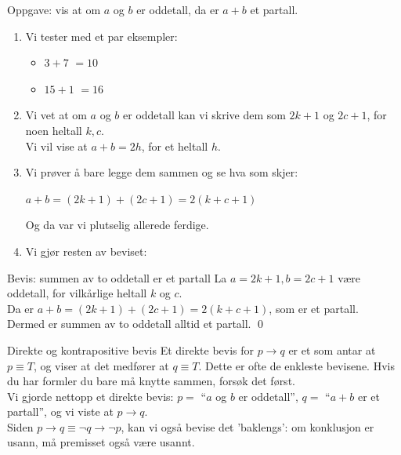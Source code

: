 \begin{frame}{Oppgave: vis at om $a$ og $b$ er oddetall, da er $a + b$ et partall.}
    \pause
    \begin{enumerate}
        \item Vi tester med et par eksempler: 
        \begin{itemize}
            \item $3+7$ \pause $= 10$ \checkmark
            \pause
            \item $15+1$ \pause $ = 16$ \checkmark
        \end{itemize}
        \pause
        \item Vi vet at om $a$ og $b$ er oddetall kan vi skrive dem som $2k + 1$ og $2c + 1$, for noen heltall $k, c$. \\
        \pause
        Vi vil vise at $a + b = 2h$, for et heltall $h$.
        \pause
        \item Vi prøver å bare legge dem sammen og se hva som skjer:
        
        $a + b = (2k + 1) + (2c + 1) = 2(k + c + 1)$

        Og da var vi plutselig allerede ferdige.
        \pause
        \item Vi gjør resten av beviset:
    \end{enumerate}

    \begin{block}{Bevis: summen av to oddetall er et partall}
        La $a = 2k + 1, b = 2c + 1$ være oddetall, for vilkårlige heltall $k$ og $c$.\\
        \pause
        Da er $a + b = (2k + 1) + (2c + 1) = 2(k + c + 1)$, som er et partall.\\
        \pause Dermed er summen av to oddetall alltid et partall. \qed
    \end{block}
\end{frame}

\begin{frame}{Direkte og kontrapositive bevis}
    Et direkte bevis for $p \rightarrow q$ er et som antar at $p \equiv T$, og viser at det medfører at $q \equiv T$.
    Dette er ofte de enkleste bevisene. Hvis du har formler du bare må knytte sammen, forsøk det først.\\

    \pause
    Vi gjorde nettopp et direkte bevis: $p =$ ``$a$ og $b$ er oddetall'', $q =$ ``$a+b$ er et partall'', og vi viste at $p \rightarrow q$.\\

    \pause
    Siden $p \rightarrow q \equiv \lnot q \rightarrow \lnot p$, kan vi også bevise det 'baklengs': om konklusjon er usann, må premisset også være usannt.
\end{frame}

